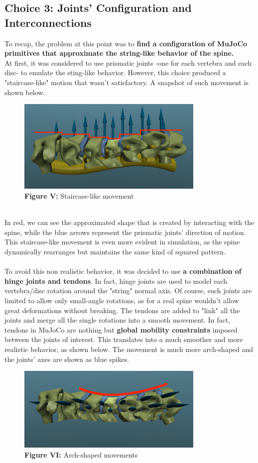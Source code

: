 \documentclass[a4paper, 12pt]{article}
\def\FigureFive{\centering\includegraphics[width=0.8\textwidth]{Figures/fig05.pdf}}
\def\FigureSix{\centering\includegraphics[width=0.8\textwidth]{Figures/fig06.pdf}}
\begin{document}
\subsection{Choice 3: Joints' Configuration and Interconnections}
To recap, the problem at this point was to \textbf{find a configuration of MuJoCo primitives that approximate the string-like behavior of the spine.}
\\ At first, it was considered to use prismatic joints -one for each vertebra and each disc- to emulate the sting-like behavior. However, this choice produced a "staircase-like" motion that wasn't satisfactory. A snapshot of such movement is shown below.
\begin{figure}[h!]
    \FigureFive
    \caption*{\textbf{Figure V:} Staircase-like movement}
    \label{fig:fig05}
\end{figure}
\\In red, we can see the approximated shape that is created by interacting with the spine, while the blue arrows represent the prismatic joints' direction of motion. This staircase-like movement is even more evident in simulation, as the spine dynamically rearranges but maintains the same kind of squared pattern.
\\\\ To avoid this non realistic behavior, it was decided to use \textbf{a combination of hinge joints and tendons}. In fact, hinge joints are used to model each vertebra/disc rotation around the "string" normal axis. Of course, such joints are limited to allow only small-angle rotations, as for a real spine wouldn't allow great deformations without breaking. The tendons are added to "link" all the joints and merge all the single rotations into a smooth movement. In fact, tendons in MuJoCo are nothing but \textbf{global mobility constraints} imposed between the joints of interest. This translates into a much smoother and more realistic behavior, as shown below. The movement is much more arch-shaped and the joints' axes are shown as blue spikes.
\begin{figure}[h!]
    \FigureSix
    \caption*{\textbf{Figure VI:} Arch-shaped movements}
    \label{fig:fig06}
\end{figure}
\end{document}
